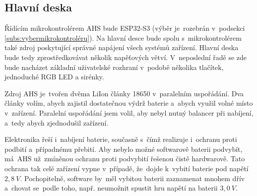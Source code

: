 
\newpage
\subsection{Hlavní deska}

Řídícím mikrokontrolérem AHS bude ESP32-S3 (výběr je~rozebrán v~podsekci \ref{subs:vybermikrokontroléru}).
Na hlavní desce bude spolu s~mikrokontrolérem také zdroj poskytující správné napájení všech systémů zařízení.
Hlavní deska bude tedy zprostředkovávat několik napěťových větví.
V~neposlední řadě se zde bude nacházet základní uživatelské rozhraní v~podobě několika tlačítek, jednoduché RGB LED a sirénky.

Zdroj AHS je~tvořen dvěma LiIon články 18650 v~paralelním uspořádání.
Dva články volím, abych zajistil dostatečnou výdrž baterie a~abych využil volné místo v~zařízení.
Paralelní uspořádání jsem volil, aby nebyl nutný balancer při nabíjení, a~tedy abych zjednodušil zařízení.

Elektronika řeší i~nabíjení baterie, současně s~čímž realizuje i~ochranu proti podbití a~případnému přebití.
Aby nebylo možné softwarově baterii podvybít, má~AHS už~zmíněnou ochranu proti podvybití řešenou čistě hardwarově.
Tato ochrana tak celé zařízení vypne v~případě, že~dojde k~vybití baterie pod napětí \(2,8~V\).
Pochopitelně, software by~měl vybitou baterii zaznamenat mnohem dřív a~chovat se~podle toho, např. neumožnit spustit hru napětí na baterii \(3,0~V\).

